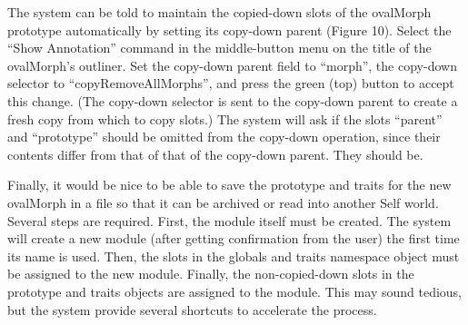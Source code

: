 \documentclass[letterpaper,10pt,english]{sphinxmanual}
\begin{document}
The system can be told to maintain the copied-down slots of the ovalMorph prototype automatically by setting its copy-down parent (Figure 10). Select the ``Show Annotation'' command in the middle-button menu on the title of the ovalMorph's outliner. Set the copy-down parent field to ``morph'', the copy-down selector to ``copyRemoveAllMorphs'', and press the green (top) button to accept this change. (The copy-down selector is sent to the copy-down parent to create a fresh copy from which to copy slots.) The system will ask if the slots ``parent'' and ``prototype'' should be omitted from the copy-down operation, since their contents differ from that of that of the copy-down parent. They should be.

Finally, it would be nice to be able to save the prototype and traits for the new ovalMorph in a file so that it can be archived or read into another Self world. Several steps are required. First, the module itself must be created. The system will create a new module (after getting confirmation from the user) the first time its name is used. Then, the slots in the globals and traits namespace object must be assigned to the new module. Finally, the non-copied-down slots in the prototype and traits objects are assigned to the module. This may sound tedious, but the system provide several shortcuts to accelerate the process.
\end{document}
